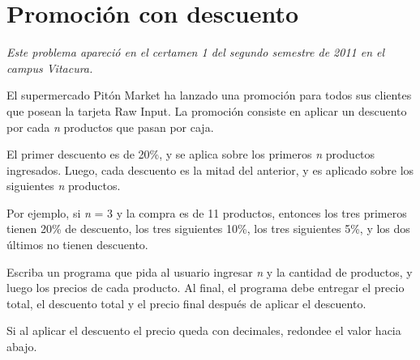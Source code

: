 \section{Promoción con descuento}

\emph{Este problema apareció en el certamen 1 del segundo semestre de
2011 en el campus Vitacura.}

El supermercado Pitón Market ha lanzado una promoción para todos sus
clientes que posean la tarjeta Raw Input. La promoción consiste en
aplicar un descuento por cada \emph{n} productos que pasan por caja.

El primer descuento es de 20\%, y se aplica sobre los primeros \emph{n}
productos ingresados. Luego, cada descuento es la mitad del anterior, y
es aplicado sobre los siguientes \emph{n} productos.

Por ejemplo, si \emph{n} = 3 y la compra es de 11 productos, entonces
los tres primeros tienen 20\% de descuento, los tres siguientes 10\%,
los tres siguientes 5\%, y los dos últimos no tienen descuento.

Escriba un programa que pida al usuario ingresar \emph{n} y la cantidad
de productos, y luego los precios de cada producto. Al final, el
programa debe entregar el precio total, el descuento total y el precio
final después de aplicar el descuento.

Si al aplicar el descuento el precio queda con decimales, redondee el
valor hacia abajo.
